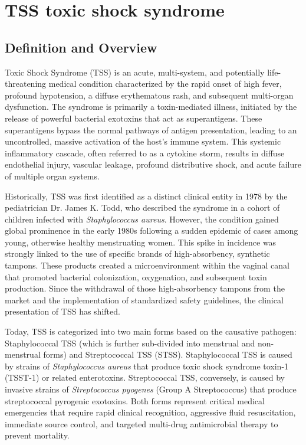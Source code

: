 \chapter{TSS toxic shock syndrome}

\section*{Definition and Overview}
Toxic Shock Syndrome (TSS) is an acute, multi-system, and potentially life-threatening medical condition characterized by the rapid onset of high fever, profound hypotension, a diffuse erythematous rash, and subsequent multi-organ dysfunction. The syndrome is primarily a toxin-mediated illness, initiated by the release of powerful bacterial exotoxins that act as superantigens. These superantigens bypass the normal pathways of antigen presentation, leading to an uncontrolled, massive activation of the host's immune system. This systemic inflammatory cascade, often referred to as a cytokine storm, results in diffuse endothelial injury, vascular leakage, profound distributive shock, and acute failure of multiple organ systems.

Historically, TSS was first identified as a distinct clinical entity in 1978 by the pediatrician Dr. James K. Todd, who described the syndrome in a cohort of children infected with \textit{Staphylococcus aureus}. However, the condition gained global prominence in the early 1980s following a sudden epidemic of cases among young, otherwise healthy menstruating women. This spike in incidence was strongly linked to the use of specific brands of high-absorbency, synthetic tampons. These products created a microenvironment within the vaginal canal that promoted bacterial colonization, oxygenation, and subsequent toxin production. Since the withdrawal of those high-absorbency tampons from the market and the implementation of standardized safety guidelines, the clinical presentation of TSS has shifted.

Today, TSS is categorized into two main forms based on the causative pathogen: Staphylococcal TSS (which is further sub-divided into menstrual and non-menstrual forms) and Streptococcal TSS (STSS). Staphylococcal TSS is caused by strains of \textit{Staphylococcus aureus} that produce toxic shock syndrome toxin-1 (TSST-1) or related enterotoxins. Streptococcal TSS, conversely, is caused by invasive strains of \textit{Streptococcus pyogenes} (Group A Streptococcus) that produce streptococcal pyrogenic exotoxins. Both forms represent critical medical emergencies that require rapid clinical recognition, aggressive fluid resuscitation, immediate source control, and targeted multi-drug antimicrobial therapy to prevent mortality.

